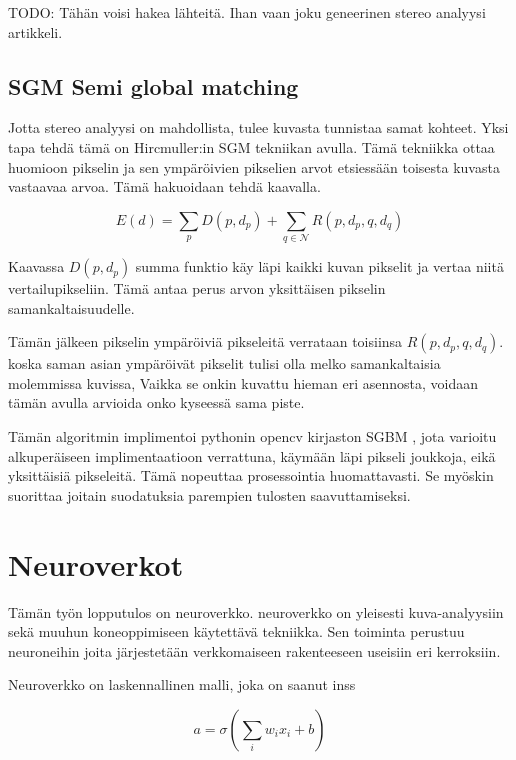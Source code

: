 TODO: Tähän voisi hakea lähteitä. Ihan vaan joku geneerinen stereo analyysi artikkeli.


\subsection{SGM Semi global matching}

Jotta stereo analyysi on mahdollista,
tulee kuvasta tunnistaa samat kohteet.
Yksi tapa tehdä tämä on Hircmuller:in SGM tekniikan avulla\cite{hirschmuller2005babel}.
Tämä tekniikka ottaa huomioon pikselin ja sen ympäröivien pikselien arvot etsiessään toisesta kuvasta vastaavaa arvoa. Tämä hakuoidaan tehdä kaavalla.

\begin{equation}\label{yht:SGM}
    E(d) = \sum_{p} D(p, d_p) + \sum_{q \in \mathcal{N}} R(p, d_p, q, d_q)
\end{equation}

Kaavassa \(D(p, d_p)\) summa funktio käy läpi kaikki kuvan pikselit ja vertaa niitä vertailupikseliin.
Tämä antaa perus arvon yksittäisen pikselin samankaltaisuudelle.

Tämän jälkeen pikselin ympäröiviä pikseleitä verrataan toisiinsa \(R(p, d_p, q, d_q)\).
koska saman asian ympäröivät pikselit tulisi olla melko samankaltaisia molemmissa kuvissa, 
Vaikka se onkin kuvattu hieman eri asennosta, voidaan tämän avulla arvioida onko kyseessä sama piste.

Tämän algoritmin implimentoi pythonin opencv kirjaston SGBM \cite{opencvsgbm},
jota varioitu alkuperäiseen implimentaatioon verrattuna, käymään läpi pikseli joukkoja, eikä yksittäisiä pikseleitä.
Tämä nopeuttaa prosessointia huomattavasti.
Se myöskin suorittaa joitain suodatuksia parempien tulosten saavuttamiseksi.

\section{Neuroverkot}



Tämän työn lopputulos on neuroverkko.
neuroverkko on yleisesti kuva-analyysiin sekä muuhun koneoppimiseen käytettävä tekniikka.
Sen toiminta perustuu neuroneihin joita järjestetään verkkomaiseen rakenteeseen useisiin eri kerroksiin.

Neuroverkko on laskennallinen malli, joka on saanut inss


\begin{equation}\label{yht:neuroni}
    a = \sigma\left(\sum_i w_i x_i + b\right)
\end{equation}

